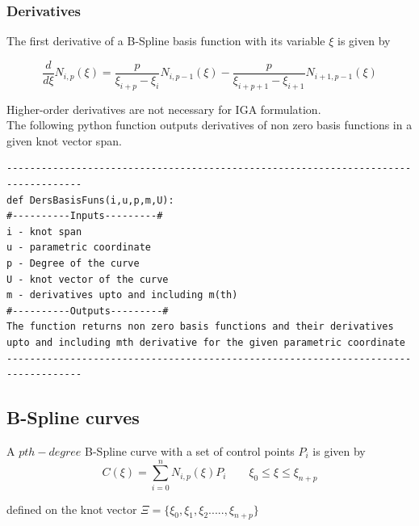 \documentclass[11pt]{article}
\begin{document}
\subsubsection{Derivatives }
The first derivative of a B-Spline basis function \cite{nguyen2012introduction} with its variable $\xi$ is
given by

\begin{equation}
\frac{d}{d\xi}N_{i,p}(\xi) = \frac{p}{\xi_{i+p}-\xi_{i}} N_{i,p-1}(\xi) -
\frac{p}{\xi_{i+p+1}-\xi_{i+1}} N_{i+1,p-1}(\xi)
\end{equation}

\noindent
Higher-order derivatives are not necessary for IGA formulation.\\
The following python function outputs derivatives of non zero basis functions in a given knot vector span.
\begin{verbatim}
-----------------------------------------------------------------------------------
def DersBasisFuns(i,u,p,m,U):
#----------Inputs---------#
i - knot span
u - parametric coordinate
p - Degree of the curve
U - knot vector of the curve
m - derivatives upto and including m(th) 
#----------Outputs---------#
The function returns non zero basis functions and their derivatives
upto and including mth derivative for the given parametric coordinate
-----------------------------------------------------------------------------------
\end{verbatim}

\subsection{B-Spline curves}

A $pth-degree$ B-Spline curve with a set of control points $P_i$ is given by \cite{piegl2012nurbs}
\begin{equation}
C(\xi) = \sum_{i=0}^{n} N_{i,p}(\xi) P_i \qquad \xi_0 \leq \xi \leq \xi_{n+p}
\end{equation}

\noindent
defined on the knot vector $\Xi = \{ \xi_0,\xi_1,\xi_2.....,\xi_{n+p}\}$
\end{document}
